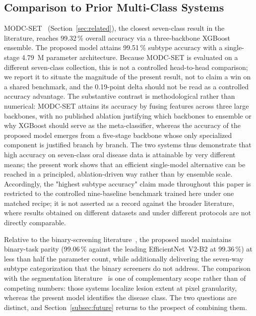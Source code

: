 \subsection{Comparison to Prior Multi-Class Systems}\label{subsec:vs_prior}

MODC-SET~\cite{ref22} (Section~\ref{sec:related}), the closest seven-class
result in the literature, reaches 99.32\,\% overall accuracy via a three-backbone
XGBoost ensemble. The proposed model attains 99.51\,\% subtype accuracy with a
single-stage 4.79~M parameter architecture. Because MODC-SET is evaluated on a
different seven-class collection, this is not a controlled head-to-head
comparison; we report it to situate the magnitude of the present result, not to
claim a win on a shared benchmark, and the 0.19-point delta should not be read
as a controlled accuracy advantage. The substantive contrast is methodological
rather than numerical: MODC-SET attains its accuracy by fusing features across
three large backbones, with no published ablation justifying which backbones to
ensemble or why XGBoost should serve as the meta-classifier, whereas the
accuracy of the proposed model emerges from a five-stage backbone whose only
specialized component is justified branch by branch. The two systems thus
demonstrate that high accuracy on seven-class oral disease data is attainable
by very different means; the present work shows that an efficient single-model
alternative can be reached in a principled, ablation-driven way rather than by
ensemble scale. Accordingly, the "highest subtype accuracy" claim made
throughout this paper is restricted to the controlled nine-baseline benchmark
trained here under one matched recipe; it is not asserted as a record against
the broader literature, where results obtained on different datasets and under
different protocols are not directly comparable.

Relative to the binary-screening literature~\cite{ref5,ref16,ref17}, the
proposed model maintains binary-task parity (99.06\,\% against the leading
EfficientNet~V2-B2 at 99.36\,\%) at less than half the parameter count,
while additionally delivering the seven-way subtype categorization that the
binary screeners do not address. The comparison with the segmentation
literature~\cite{ref15,ref26} is one of complementary scope rather than of
competing numbers: those systems localize lesion extent at pixel granularity,
whereas the present model identifies the disease class. The two questions are
distinct, and Section~\ref{subsec:future} returns to the prospect of combining
them.

